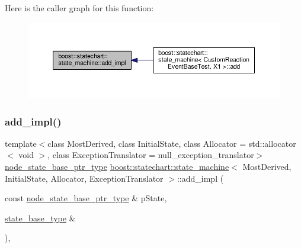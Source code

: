 Here is the caller graph for this function\+:
\nopagebreak
\begin{figure}[H]
\begin{center}
\leavevmode
\includegraphics[width=350pt]{classboost_1_1statechart_1_1state__machine_a1e24717585bec9141b46d1807c40f517_icgraph}
\end{center}
\end{figure}
\mbox{\label{classboost_1_1statechart_1_1state__machine_a7e879458268733c24259d71969278ac5}} 
\subsubsection{\texorpdfstring{add\+\_\+impl()}{add\_impl()}\hspace{0.1cm}{\footnotesize\ttfamily [2/2]}}
{\footnotesize\ttfamily template$<$class Most\+Derived, class Initial\+State, class Allocator = std\+::allocator$<$ void $>$, class Exception\+Translator = null\+\_\+exception\+\_\+translator$>$ \\
\mbox{\hyperlink{classboost_1_1statechart_1_1state__machine_a5d90f1176309ec8307979aa79dd6f4a3}{node\+\_\+state\+\_\+base\+\_\+ptr\+\_\+type}} \mbox{\hyperlink{classboost_1_1statechart_1_1state__machine}{boost\+::statechart\+::state\+\_\+machine}}$<$ Most\+Derived, Initial\+State, Allocator, Exception\+Translator $>$\+::add\+\_\+impl (\begin{DoxyParamCaption}\item[{const \mbox{\hyperlink{classboost_1_1statechart_1_1state__machine_a5d90f1176309ec8307979aa79dd6f4a3}{node\+\_\+state\+\_\+base\+\_\+ptr\+\_\+type}} \&}]{p\+State,  }\item[{\mbox{\hyperlink{classboost_1_1statechart_1_1state__machine_a69cc258c29fcabec25c5dc8bedb7d530}{state\+\_\+base\+\_\+type}} \&}]{ }\end{DoxyParamCaption})\hspace{0.3cm}{\ttfamily [inline]}, {\ttfamily [private]}}

